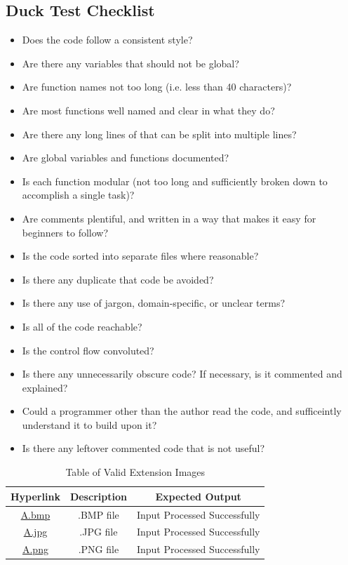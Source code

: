 \documentclass[12pt, titlepage]{article}
\begin{document}
\subsection{Duck Test Checklist} \label{checklist_duckTest}

\begin{itemize}
  \item{Does the code follow a consistent style?}
  \item{Are there any variables that should not be global?}
  \item{Are function names not too long (i.e. less than 40 characters)?}
  \item{Are most functions well named and clear in what they do?}
  \item{Are there any long lines of that can be split into multiple lines?}
  \item{Are global variables and functions documented?}
  \item{Is each function modular (not too long and sufficiently broken down to accomplish a single task)?}
  \item{Are comments plentiful, and written in a way that makes it easy for beginners to follow?}
  \item{Is the code sorted into separate files where reasonable?}
  \item{Is there any duplicate that code be avoided?}
  \item{Is there any use of jargon, domain-specific, or unclear terms?}
  \item{Is all of the code reachable?}
  \item{Is the control flow convoluted?}
  \item{Is there any unnecessarily obscure code? If necessary, is it commented and explained?}
  \item{Could a programmer other than the author read the code, and sufficeintly understand it to build upon it?}
  \item{Is there any leftover commented code that is not useful?}
\end{itemize}

\begin{table}[h!]
  \centering
  \begin{tabular}{|c|c|c|}
    \hline
    \textbf{Hyperlink} & \textbf{Description} & \textbf{Expected Output} \\ \hline
    \href{https://github.com/cer-hunter/OAR-CAS741/tree/main/tests/test-images/A.bmp}{A.bmp} & .BMP file & Input Processed Successfully \\ \hline
    \href{https://github.com/cer-hunter/OAR-CAS741/tree/main/tests/test-images/A.jpg}{A.jpg} & .JPG file & Input Processed Successfully \\ \hline
    \href{https://github.com/cer-hunter/OAR-CAS741/tree/main/tests/test-images/A.png}{A.png} & .PNG file & Input Processed Successfully \\ \hline
  \end{tabular}
  \caption{Table of Valid Extension Images}
  \label{table_ext}
\end{table}
\end{document}
